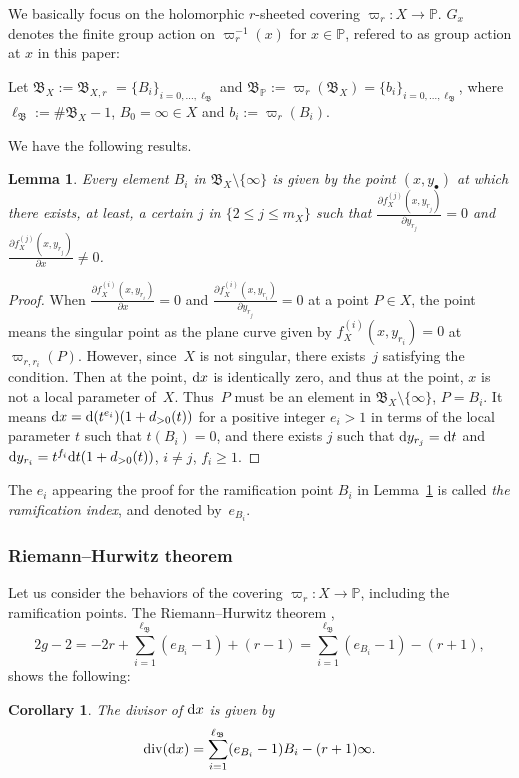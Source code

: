 \documentclass[pdftex]{sigma}
\def\PP{{\mathbb P}}
\def\fB{{\mathfrak B}}
\def\Div{\operatorname{div}}
\numberwithin{equation}{section}
\newtheorem{Corollary}[Theorem]{Corollary}
\newtheorem{Lemma}[Theorem]{Lemma}
\begin{document}
We basically focus on the holomorphic $r$-sheeted covering $\varpi_{r}\colon X \to \PP$. $G_x$ denotes the finite group action on $\varpi_r^{-1}(x)$
for $x\in \mathbb P$, refered to as group action at $x$ in this paper:
\begin{Definition}\label{2df:fBX}
Let $\fB_X:=\fB_{X,r}$ $=\{B_{i}\}_{i=0, \dots, \ell_{\fB}}$ and $\fB_{\PP}:=\varpi_r(\fB_X)=\{b_{i}\}_{i=0, \dots, \ell_{\fB}}$, where $\ell_{\fB}:= \# \fB_X-1$, $B_{0}=\infty\in X$ and $b_i :=\varpi_r(B_i)$.
\end{Definition}

We have the following results.

\begin{Lemma}\label{2lm:B_iVanish}
Every element $B_i$ in $\fB_X \setminus \{\infty\}$ is given by the point $(x, y_\bullet)$ at which there exists, at least, a certain $j$ in $\{2\le j\le m_X\}$ such that $\frac{\partial f_X^{(j)}(x,y_{r_j})}{\partial y_{r_j}}=0$
and $\frac{\partial f_X^{(j)}(x,y_{r_j})}{\partial x}\neq 0$.
\end{Lemma}

\begin{proof}
When $\frac{\partial f_X^{(i)}(x,y_{r_i})}{\partial x}=0$ and $\frac{\partial f_X^{(i)}(x,y_{r_i})}{\partial y_{r_j}}=0$ at a point $P\in X$, the point means the singular point as the plane curve given by $f_X^{(i)}(x,y_{r_i})=0$ at $\varpi_{r, r_i}(P)$.
However, since~$X$ is not singular, there exists~$j$ satisfying the condition.
Then at the point, ${\rm d} x$ is identically zero, and thus at the point, $x$ is not a local parameter of~$X$. Thus~$P$ must be an element in $\fB_X\setminus \{\infty\}$, $P=B_{i}$.
It means ${\rm d} x={\rm d}(t^{e_i})(1+d_{>0}(t))$ for a positive integer $e_i>1$ in terms of the local parameter $t$ such that $t(B_i) = 0$, and there exists $j$ such that ${\rm d} y_{r_j} = {\rm d} t$ and ${\rm d} y_{r_i} =t^{f_i} {\rm d} t(1+d_{>0}(t))$, $i \neq j$, $f_i \ge 1$.
\end{proof}

The $e_i$ appearing the proof for the ramification point $B_i$ in Lemma~\ref{2lm:B_iVanish} is called \emph{the ramification index}, and denoted by~$e_{B_i}$.

\subsubsection{Riemann--Hurwitz theorem}

Let us consider the behaviors of the covering $\varpi_r\colon X \to \PP$, including the ramification points.
The Riemann--Hurwitz theorem \cite{Kunz2004},
\begin{equation*}
2g-2 =-2r+ \sum_{i=1}^{\ell_{\fB}} (e_{B_i}-1)+(r-1)=
\sum_{i=1}^{\ell_{\fB}} (e_{B_i}-1)-(r+1),%
\end{equation*}
 shows the following:
\begin{Corollary}\label{2cr:(dx)} The divisor of ${\rm d} x$ is given by
\[
\Div({\rm d} x) =\sum_{i=1}^{\ell_{\fB}} (e_{B_i}-1) B_i - (r+1)\infty.
\]
\end{Corollary}
\end{document}
